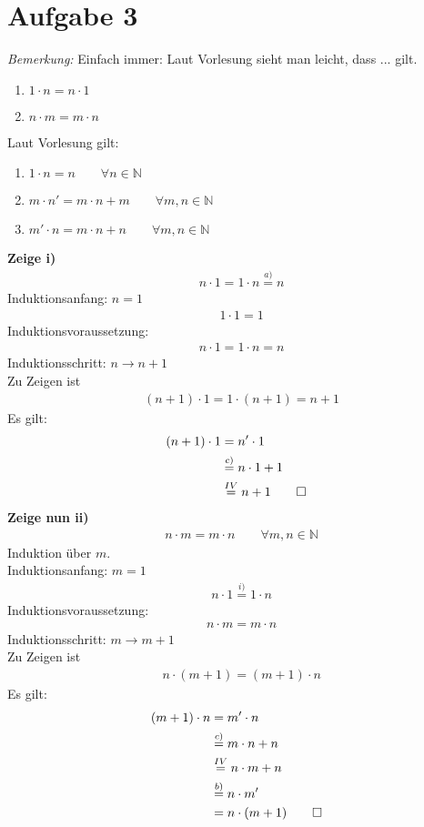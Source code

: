 \section{Aufgabe 3}
\textit{Bemerkung:} Einfach immer: Laut Vorlesung sieht man leicht, dass ... gilt.
\begin{enumerate}[label={\roman*)}]
  \item $1\cdot n = n\cdot 1$
  \item $n\cdot m =m\cdot n$
\end{enumerate}
Laut Vorlesung gilt:
\begin{enumerate}[label={\alph*)}]
  \item $1\cdot n=n \qquad \forall n\in\mathbb{N}$
  \item $m\cdot n'=m\cdot n+m \qquad \forall m,n\in\mathbb{N}$
  \item $m'\cdot n=m\cdot n+n \qquad \forall m,n\in\mathbb{N}$
\end{enumerate}
\textbf{Zeige i)}\begin{align}&n\cdot 1=1\cdot n\overset{a)}{=}n\end{align}
Induktionsanfang: $n=1$ \begin{align}&1\cdot 1=1\end{align}
Induktionsvoraussetzung: \begin{align}&n\cdot 1=1\cdot n=n\end{align}
Induktionsschritt: $n\rightarrow n+1$ \\
Zu Zeigen ist \begin{align}&(n+1)\cdot 1=1\cdot (n+1)=n+1\end{align}
Es gilt: \begin{align}(n+1)\cdot 1&=n'\cdot 1\\ &\overset{c)}{=}n\cdot 1+1\\ &\overset{IV}{=}n+1\qed\end{align}
\textbf{Zeige nun ii)}\begin{align}&n\cdot m=m\cdot n\qquad\forall m,n\in\mathbb{N}\end{align}
Induktion über $m$.\\
Induktionsanfang: $m=1$ \begin{align}&n\cdot 1\overset{i)}{=}1\cdot n\end{align}
Induktionsvoraussetzung: \begin{align}&n\cdot m=m\cdot n\end{align}
Induktionsschritt: $m\rightarrow m+1$ \\
Zu Zeigen ist \begin{align}&n\cdot (m+1)=(m+1)\cdot n\end{align}
Es gilt: \begin{align}(m+1)\cdot n&=m'\cdot n\\ &\overset{c)}{=}m\cdot n+n\\ &\overset{IV}{=}n\cdot m+n\\ &\overset{b)}{=}n\cdot m'\\ &=n\cdot (m+1)\qed\end{align}

